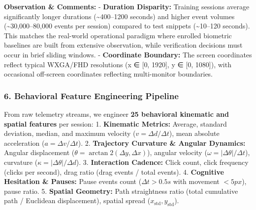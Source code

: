 \documentclass[11pt]{article}
\begin{document}
    \textbf{Observation \& Comments:} - \textbf{Duration Disparity:}
Training sessions average significantly longer durations
(\textasciitilde400--1200 seconds) and higher event volumes
(\textasciitilde30,000--80,000 events per session) compared to test
snippets (\textasciitilde10--120 seconds). This matches the real-world
operational paradigm where enrolled biometric baselines are built from
extensive observation, while verification decisions must occur in brief
sliding windows. - \textbf{Coordinate Boundary:} The screen coordinates
reflect typical WXGA/FHD resolutions (x ∈ {[}0, 1920{]}, y ∈ {[}0,
1080{]}), with occasional off-screen coordinates reflecting
multi-monitor boundaries.

    \subsubsection{6. Behavioral Feature Engineering
Pipeline}\label{behavioral-feature-engineering-pipeline}

From raw telemetry streams, we engineer \textbf{25 behavioral kinematic
and spatial features} per session: 1. \textbf{Kinematic Metrics:}
Average, standard deviation, median, and maximum velocity
(\(v = \Delta d / \Delta t\)), mean absolute acceleration
(\(a = \Delta v / \Delta t\)). 2. \textbf{Trajectory Curvature \&
Angular Dynamics:} Angular displacement
(\(\theta = \arctan2(\Delta y, \Delta x)\)), angular velocity
(\(\omega = |\Delta \theta| / \Delta t\)), curvature
(\(\kappa = |\Delta \theta| / \Delta d\)). 3. \textbf{Interaction
Cadence:} Click count, click frequency (clicks per second), drag ratio
(drag events / total events). 4. \textbf{Cognitive Hesitation \&
Pauses:} Pause events count (\(\Delta t > 0.5s\) with movement
\(< 5px\)), pause ratio. 5. \textbf{Spatial Geometry:} Path straightness
ratio (total cumulative path / Euclidean displacement), spatial spread
(\(x_{\text{std}}, y_{\text{std}}\)).
\end{document}
